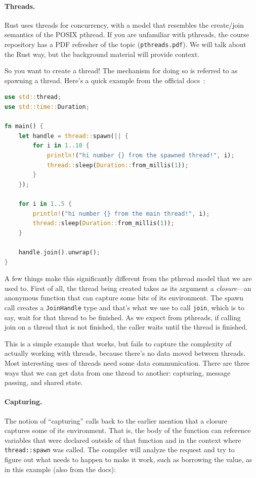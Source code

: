 \paragraph{Threads.} Rust uses threads for concurrency, with a model that resembles the create/join semantics of the POSIX pthread. If you are unfamiliar with pthreads, the course repository has a PDF refresher of the topic (\texttt{pthreads.pdf}). We will talk about the Rust way, but the background material will provide context.

So you want to create a thread! The mechanism for doing so is referred to as spawning a thread. Here's a quick example from the official docs~\cite{rustdocs}:

\begin{lstlisting}[language=Rust]
use std::thread;
use std::time::Duration;

fn main() {
    let handle = thread::spawn(|| {
        for i in 1..10 {
            println!("hi number {} from the spawned thread!", i);
            thread::sleep(Duration::from_millis(1));
        }
    });

    for i in 1..5 {
        println!("hi number {} from the main thread!", i);
        thread::sleep(Duration::from_millis(1));
    }

    handle.join().unwrap();
}
\end{lstlisting}

A few things make this significantly different from the pthread model that we are used to. First of all, the thread being created takes as its argument a \textit{closure}---an anonymous function that can capture some bits of its environment. The spawn call creates a \texttt{JoinHandle} type and that's what we use to call \texttt{join}, which is to say, wait for that thread to be finished. As we expect from pthreads, if calling join on a thread that is not finished, the caller waits until the thread is finished.

This is a simple example that works, but fails to capture the complexity of actually working with threads, because there's no data moved between threads. Most interesting uses of threads need some data communication. There are three ways that we can get data from one thread to another: capturing, message passing, and shared state.

\paragraph{Capturing.} 
The notion of ``capturing'' calls back to the earlier mention that a closure captures some of its environment. That is, the body of the function can reference variables that were declared outside of that function and in the context where \texttt{thread::spawn} was called. The compiler will analyze the request and try to figure out what needs to happen to make it work, such as borrowing the value, as in this example (also from the docs):

